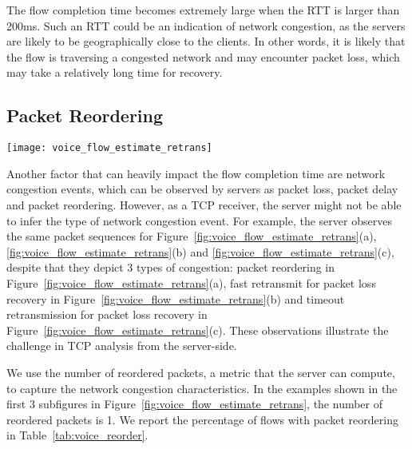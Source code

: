 The flow completion time becomes extremely large when the RTT is larger than 200ms. Such an RTT could be an indication of network congestion, as the servers are likely to be geographically close to the clients. In other words, it is likely that the flow is traversing a congested network and may encounter packet loss, which may take a relatively long time for recovery.

\subsection{Packet Reordering}
\label{sec:v_pd}


\begin{figure*}[th]
\centering
	\texttt{[image: voice\_flow\_estimate\_retrans]}
\caption{Server could not distinguish packet reordering events, which are (a) packet reordering, (b) fast retransmit, and (c) timeout retransmission. Server may identify some timeout retransmissions as long packet delay (d).}
\label{fig:voice_flow_estimate_retrans}
\end{figure*}

Another factor that can heavily impact the flow completion time are network congestion events, which can be observed by servers as packet loss, packet delay and packet reordering. However, as a TCP receiver, the server might not be able to infer the type of network congestion event. For example, the server observes the same packet sequences for Figure~\ref{fig:voice_flow_estimate_retrans}(a), \ref{fig:voice_flow_estimate_retrans}(b) and \ref{fig:voice_flow_estimate_retrans}(c), despite that they depict 3 types of congestion: packet reordering in Figure~\ref{fig:voice_flow_estimate_retrans}(a), fast retransmit for packet loss recovery in Figure~\ref{fig:voice_flow_estimate_retrans}(b) and timeout retransmission for packet loss recovery in Figure~\ref{fig:voice_flow_estimate_retrans}(c). These observations illustrate the challenge in TCP analysis from the server-side.

We use the number of reordered packets, a metric that the server can compute, to capture the network congestion characteristics. In the examples shown in the first 3 subfigures in Figure~\ref{fig:voice_flow_estimate_retrans}, the number of reordered packets is 1. %
We report the percentage of flows with packet reordering in Table~\ref{tab:voice_reorder}.

